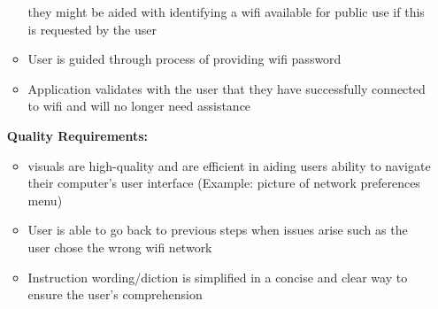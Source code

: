 \documentclass[12pt, letterpaper]{article}
\begin{document}
\begin{enumerate}
\begin{itemize}
		they might be aided with identifying a wifi available for public use if this is requested by the user
		\item User is guided through process of providing wifi password 
		\item Application validates with the user that they have successfully connected to wifi and will no longer need assistance
	\end{itemize}
	\textbf{Quality Requirements:}
	\begin{itemize}
		\item visuals are high-quality and are efficient in aiding users ability to navigate their computer’s user interface (Example: picture of network preferences menu)
		\item User is able to go back to previous steps when issues arise such as the user chose the wrong wifi network
		\item Instruction wording/diction is simplified in a concise and clear way to ensure the user’s comprehension 
	\end{itemize}


\end{enumerate}
\end{document}
